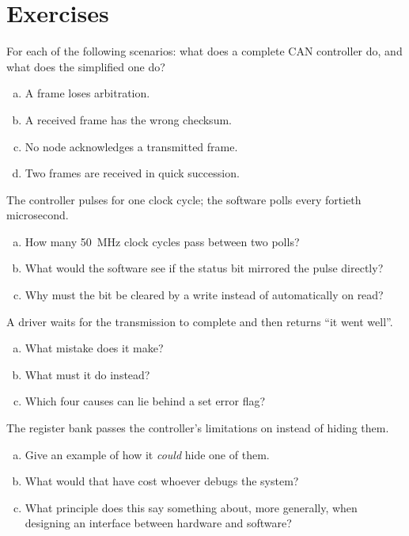 \section*{Exercises}

\label{ex:7:1}
For each of the following scenarios: what does a complete CAN controller do, and what does the
simplified one do?
\begin{enumerate}[a)]
  \item A frame loses arbitration.
  \item A received frame has the wrong checksum.
  \item No node acknowledges a transmitted frame.
  \item Two frames are received in quick succession.
\end{enumerate}

\label{ex:7:2}
The controller pulses for one clock cycle; the software polls every fortieth microsecond.
\begin{enumerate}[a)]
  \item How many 50~MHz clock cycles pass between two polls?
  \item What would the software see if the status bit mirrored the pulse directly?
  \item Why must the bit be cleared by a write instead of automatically on read?
\end{enumerate}

\label{ex:7:3}
A driver waits for the transmission to complete and then returns ``it went well''.
\begin{enumerate}[a)]
  \item What mistake does it make?
  \item What must it do instead?
  \item Which four causes can lie behind a set error flag?
\end{enumerate}

\label{ex:7:4}
The register bank passes the controller's limitations on instead of hiding them.
\begin{enumerate}[a)]
  \item Give an example of how it \emph{could} hide one of them.
  \item What would that have cost whoever debugs the system?
  \item What principle does this say something about, more generally, when designing an interface
    between hardware and software?
\end{enumerate}
